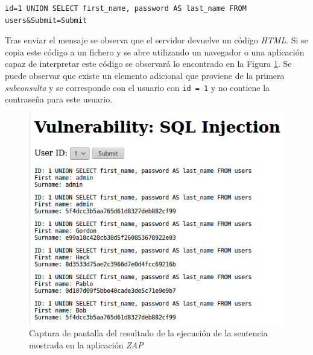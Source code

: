 \documentclass{article}
\begin{document}

\begin{lstlisting}
id=1 UNION SELECT first_name, password AS last_name FROM users&Submit=Submit
\end{lstlisting}

Tras enviar el mensaje se observa que el servidor devuelve un código \textit{HTML}. Si se copia este código a un fichero y se abre utilizando un navegador o una aplicación capaz de interpretar este código se observará lo encontrado en la Figura \ref{fig:sql_injection_medium}. Se puede observar que existe un elemento adicional que proviene de la primera \textit{subconsulta} y se corresponde con el usuario con \texttt{id = 1} y no contiene la contraseña para este usuario.\\

\begin{figure}[h!]
    \centering
    \includegraphics[scale=0.8]{images/sql_injection_medium.png}
    \caption{Captura de pantalla del resultado de la ejecución de la sentencia mostrada en la aplicación \textit{ZAP}}
    \label{fig:sql_injection_medium}
\end{figure}
\end{document}
